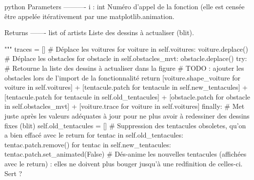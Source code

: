 \begin{mintedbox}{python}
        Parameters
        ----------
        i : int
            Numéro d'appel de la fonction (elle est censée être appelée itérativement par une matplotlib.animation.

        Returns
        -------
        list of artists
            Liste des dessins à actualiser (blit).

        """
        traces = []
        # Déplace les voitures
        for voiture in self.voitures:
            voiture.deplace()
        # Déplace les obstacles
        for obstacle in self.obstacles_mvt:
            obstacle.deplace()
        try:
            # Retourne la liste des dessins à actualiser dans la figure
            # TODO : ajouter les obstacles lors de l'import de la fonctionnalité
            return [voiture.shape_voiture for voiture in self.voitures] + [tentacule.patch for tentacule in self.new_tentacules] + [tentacule.patch for tentacule in self.old_tentacules] + [obstacle.patch for obstacle in self.obstacles_mvt] + [voiture.trace for voiture in self.voitures]
        finally:
            # Met juste après les valeurs adéquates à jour pour ne plus avoir à redessiner des dessins fixes (blit)
            self.old_tentacules = []  # Suppression des tentacules obsoletes, qu'on a bien effacé avec le return
            for tentac in self.old_tentacules:
                tentac.patch.remove()
            for tentac in self.new_tentacules:
                tentac.patch.set_animated(False)  # Dés-anime les nouvelles tentacules (affichées avec le return) : elles ne doivent plus bouger jusqu'à une redfinition de celles-ci. Sert ?

\end{mintedbox}
